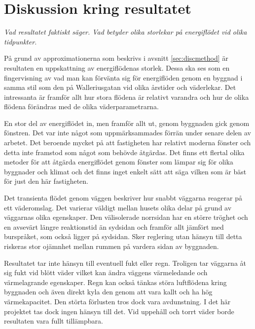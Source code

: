 \section{Diskussion kring resultatet}

\emph{\color{red} Vad resultatet faktiskt säger. Vad betyder olika storlekar på energiflödet vid olika tidpunkter.}

På grund av approximationerna som beskrivs i avsnitt \ref{sec:discmethod} är resultaten en uppskattning av energiflödenas storlek. Dessa ska ses som en fingervisning av vad man kan förvänta sig för energiflöden genom en byggnad i samma stil som den på Walleriusgatan vid olika årstider och väderlekar. Det intressanta är framför allt hur stora flödena är relativt varandra och hur de olika flödena förändras med de olika väderparametrarna.

En stor del av energiflödet in, men framför allt ut, genom byggnaden gick genom fönstren. Det var inte något som uppmärksammades förrän under senare delen av arbetet. Det beroende mycket på att fastigheten har relativt moderna fönster och detta inte framstod som något som behövde åtgärdas. Det finns ett flertal olika metoder för att åtgärda energiflödet genom fönster som lämpar sig för olika byggnader och klimat och det finns inget enkelt sätt att säga vilken som är bäst för just den här fastigheten.

Det transienta flödet genom väggen beskriver hur snabbt väggarna reagerar på ett väderomslag. Det varierar väldigt mellan husets olika delar på grund av väggarnas olika egenskaper. Den välisolerade norrsidan har en större tröghet och en avsevärt längre reaktionstid än sydsidan och framför allt jämfört med burspråket, som också ligger på sydsidan. Sker reglering utan hänsyn till detta riskeras stor ojämnhet mellan rummen på vardera sidan av byggnaden.

Resultatet tar inte hänsyn till eventuell fukt eller regn. Troligen tar väggarna åt sig fukt vid blött väder vilket kan ändra väggens värmeledande och värmelagrande egenskaper. Regn kan också tänkas störa luftflödena kring byggnaden och även direkt kyla den genom att vara kallt och ha hög värmekapacitet. Den störta förlusten tros dock vara avdunstning. I det här projektet tas dock ingen hänsyn till det. Vid uppehåll och torrt väder borde resultaten vara fullt tillämpbara.

